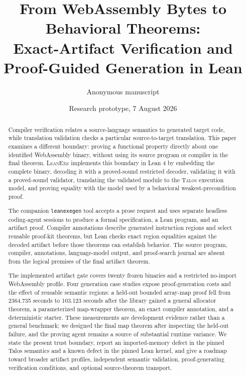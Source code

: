 \documentclass[11pt]{article}
\title{From WebAssembly Bytes to Behavioral Theorems:\\
Exact-Artifact Verification and Proof-Guided Generation in Lean}
\author{Anonymous manuscript}
\date{Research prototype, 7 August 2026}
\newcommand{\leanexe}{\textsc{LeanExe}}
\newcommand{\leanexegen}{\texttt{leanexegen}}
\newcommand{\talos}{\textsc{Talos}}
\begin{document}
\maketitle

\begin{abstract}
Compiler verification relates a source-language semantics to generated target code, while translation validation checks a particular source-to-target translation.  This paper examines a different boundary: proving a functional property directly about one identified WebAssembly binary, without using its source program or compiler in the final theorem.  \leanexe{} implements this boundary in Lean 4 by embedding the complete binary, decoding it with a proved-sound restricted decoder, validating it with a proved-sound validator, translating the validated module to the \talos{} execution model, and proving equality with the model used by a behavioral weakest-precondition proof.

The companion \leanexegen{} tool accepts a prose request and uses separate headless coding-agent sessions to produce a formal specification, a Lean program, and an artifact proof.  Compiler annotations describe generated instruction regions and select reusable proof-kit theorems, but Lean checks exact region equalities against the decoded artifact before those theorems can establish behavior.  The source program, compiler, annotations, language-model output, and proof-search journal are absent from the logical premises of the final artifact theorem.

The implemented artifact gate covers twenty frozen binaries and a restricted no-import WebAssembly profile.  Four generation case studies expose proof-generation costs and the effect of reusable semantic regions: a held-out bounded array-map proof fell from 2364.735 seconds to 103.123 seconds after the library gained a general allocator theorem, a parameterized map-wrapper theorem, an exact compiler annotation, and a deterministic starter.  These measurements are development evidence rather than a general benchmark; we designed the final map theorem after inspecting the held-out failure, and the proving agent remains a source of substantial runtime variance.  We state the present trust boundary, report an imported-memory defect in the pinned Talos semantics and a known defect in the pinned Lean kernel, and give a roadmap toward broader artifact profiles, independent semantic validation, proof-generating verification conditions, and optional source-theorem transport.
\end{abstract}
\end{document}
